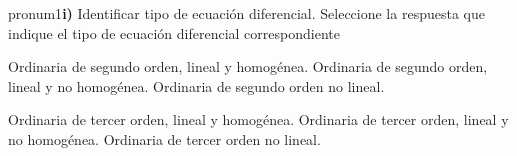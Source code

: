\documentclass[letterpaper,10p]{article}
\begin{document}
\begin{quiz}{pronum1}{\textbf{i)} Identificar tipo de ecuación diferencial. Seleccione la respuesta que indique el tipo de ecuación diferencial correspondiente}
\begin{questions}
			
			\begin{answers}{1}
				 Ordinaria de segundo orden, lineal y homogénea.
				 Ordinaria de segundo orden, lineal y  no homogénea.
				 Ordinaria de segundo orden no lineal.
			\end{answers}

		
			\problem{$y'''(x)=y(x)\sin(2x)-\sqrt{x}$}%
			\begin{answers}{1}
				 Ordinaria de tercer orden, lineal y homogénea.
				 Ordinaria de tercer orden, lineal y  no homogénea.
				 Ordinaria de tercer orden no lineal.
			\end{answers}
			
		\end{questions}
	\end{quiz}
	\ScoreField\currQuiz\eqButton\currQuiz
	
	
	\newpage
	
\end{document}

